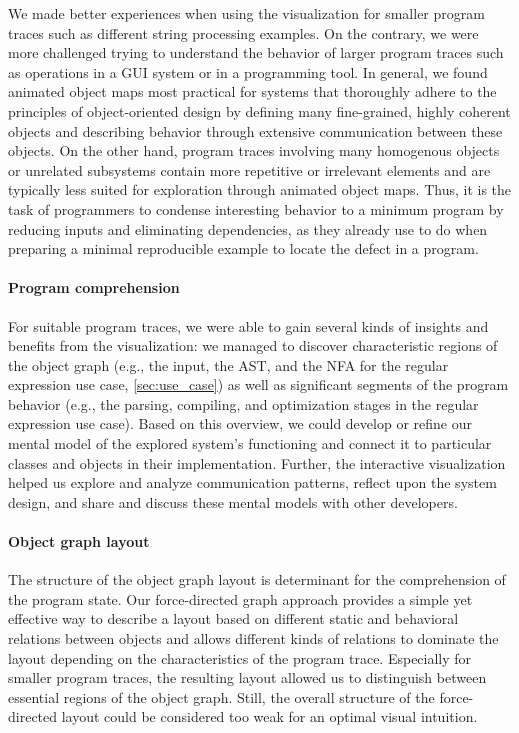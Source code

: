 We made better experiences when using the visualization for smaller program traces such as different string processing examples.
On the contrary, we were more challenged trying to understand the behavior of larger program traces such as operations in a GUI system or in a programming tool.
In general, we found animated object maps most practical for systems that thoroughly adhere to the principles of object-oriented design by defining many fine-grained, highly coherent objects and describing behavior through extensive communication between these objects.
On the other hand, program traces involving many homogenous objects or unrelated subsystems contain more repetitive or irrelevant elements and are typically less suited for exploration through animated object maps.
Thus, it is the task of programmers to condense interesting behavior to a minimum program by reducing inputs and eliminating dependencies, as they already use to do when preparing a minimal reproducible example to locate the defect in a program.

\paragraph{Program comprehension}

For suitable program traces, we were able to gain several kinds of insights and benefits from the visualization:
we managed to discover characteristic regions of the object graph (e.g., the input, the AST, and the NFA for the regular expression use case, \cref{sec:use_case}) as well as significant segments of the program behavior (e.g., the parsing, compiling, and optimization stages in the regular expression use case).
Based on this overview, we could develop or refine our mental model of the explored system's functioning and connect it to particular classes and objects in their implementation.
Further, the interactive visualization helped us explore and analyze communication patterns, reflect upon the system design, and share and discuss these mental models with other developers.

\paragraph{Object graph layout}

The structure of the object graph layout is determinant for the comprehension of the program state.
Our force-directed graph approach provides a simple yet effective way to describe a layout based on different static and behavioral relations between objects and allows different kinds of relations to dominate the layout depending on the characteristics of the program trace.
Especially for smaller program traces, the resulting layout allowed us to distinguish between essential regions of the object graph.
Still, the overall structure of the force-directed layout could be considered too weak for an optimal visual intuition.

